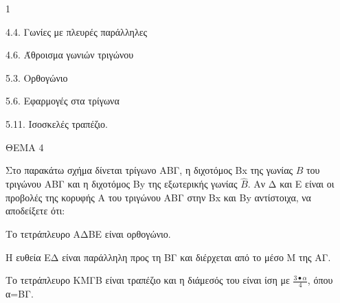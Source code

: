 \begin{ylh}{1}
    \item 4.4. Γωνίες με πλευρές παράλληλες
    \item 4.6. Άθροισμα γωνιών τριγώνου
    \item 5.3. Ορθογώνιο
    \item 5.6. Εφαρμογές στα τρίγωνα
    \item 5.11. Ισοσκελές τραπέζιο.
\end{ylh}

ΘΕΜΑ 4

Στο παρακάτω σχήμα δίνεται τρίγωνο ΑΒΓ, η διχοτόμος Βx της γωνίας $\widehat{Β}$ του τριγώνου ΑΒΓ και η διχοτόμος Βy της εξωτερικής γωνίας $\widehat{Β}$. Αν Δ και Ε είναι οι προβολές της κορυφής Α του τριγώνου ΑΒΓ στην Βx και Βy αντίστοιχα, να αποδείξετε ότι:

\begin{alist}
\item Το τετράπλευρο ΑΔΒΕ είναι ορθογώνιο. 

\item Η ευθεία ΕΔ είναι παράλληλη προς τη ΒΓ και διέρχεται από το μέσο Μ της ΑΓ.


\item Το τετράπλευρο ΚΜΓΒ είναι τραπέζιο και η διάμεσός του είναι ίση με $\frac{3 \bullet \alpha}{4}$, όπου α=ΒΓ. 


\end{alist}
